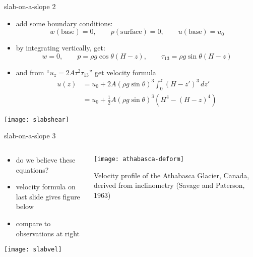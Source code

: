 \begin{frame}{slab-on-a-slope 2}

\begin{itemize}
\item add some boundary conditions:
	$$w(\text{base})=0, \qquad p(\text{surface})=0, \qquad u(\text{base})=u_0$$
\item by integrating vertically, get:
  $$w=0, \qquad p = \rho g \cos\theta (H-z), \qquad \tau_{13} = \rho g \sin\theta (H-z)$$
\item and from ``$u_z = 2 A \tau^2 \tau_{13}$'' get \alert{velocity formula}
\vspace{-0.05in}
\begin{align*}
u(z) &= u_0 + 2 A (\rho g \sin\theta)^3 \int_0^z (H-z')^3\,dz' \\
     &= u_0 + \frac{1}{2} A (\rho g \sin\theta)^3  \left(H^4 - (H-z)^4\right)
\end{align*}
\end{itemize}

\begin{center}
\texttt{[image: slabshear]}
\end{center}
\end{frame}


\begin{frame}{slab-on-a-slope 3}

\begin{columns}
\begin{column}{0.6\textwidth}
\begin{itemize}
\item do we believe these equations?
\item velocity formula on last slide gives figure below
\item compare to observations at right
\end{itemize}
\begin{center}
\texttt{[image: slabvel]}
\end{center}
\end{column}

\begin{column}{0.4\textwidth}
\texttt{[image: athabasca-deform]}

\medskip
\scriptsize
Velocity profile of the Athabasca Glacier, Canada, derived from inclinometry (Savage and Paterson, 1963)
\end{column}
\end{columns}
\end{frame}


